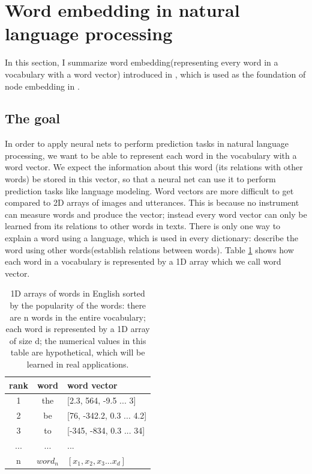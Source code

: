\documentclass{article}
\begin{document}
\section{Word embedding in natural language processing}
In this section, I summarize word embedding(representing every word in a vocabulary with a word vector) introduced in \cite{mikolov2013efficient}, which is used as the foundation of node embedding in \cite{perozzi2014deepwalk}.

\subsection{The goal}

In order to apply neural nets to perform prediction tasks in natural language processing, we want to be able to represent each word in the vocabulary with a word vector. We expect the information about this word (its relations with other words) be stored in this vector, so that a neural net can use it to perform prediction tasks like language modeling. Word vectors are more difficult to get compared to 2D arrays of images and utterances. This is because no instrument can measure words and produce the vector; instead every word vector can only be learned from its relations to other words in texts. There is only one way to explain a word using a language, which is used in every dictionary: describe the word using other words(establish relations between words). Table \ref{tab:word} shows how each word in a vocabulary is represented by a 1D array which we call word vector.

\begin{table}[h]
	\centering
	\begin{tabularx}{0.5\textwidth}{|c|c|X|} \hline
		rank & word & word vector \\ \hline
		1 & the & [2.3, 564, -9.5 ... 3] \\ \hline
		2 & be & [76, -342.2, 0.3 ... 4.2] \\ \hline
		3 & to & [-345, -834, 0.3 ... 34] \\ \hline
		... & ... & ... \\ \hline
		n & $ word_n $ & $ [x_1, x_2, x_3 ... x_d] $ \\ \hline
	\end{tabularx}
	\caption{1D arrays of words in English sorted by the popularity of the words: there are n words in the entire vocabulary; each word is represented by a 1D array of size d; the numerical values in this table are hypothetical, which will be learned in real applications.}
	\label{tab:word}
\end{table}
\end{document}
